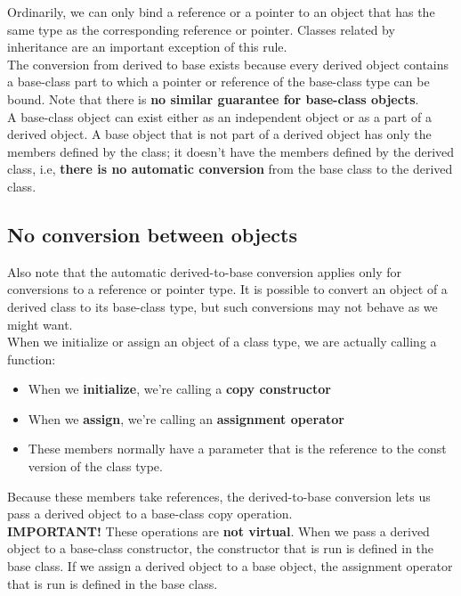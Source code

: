 Ordinarily, we can only bind a reference or a pointer to an object that has the same type as 
the corresponding reference or pointer. Classes related by inheritance are an important exception
of this rule.\\

The conversion from derived to base exists because every derived object contains a base-class 
part to which a pointer or reference of the base-class type can be bound. Note that there is
\textbf{no similar guarantee for base-class objects}. \\

A base-class object can exist either as an independent object or as a part of a derived object.
A base object that is not part of a derived object has only the members defined by the class;
it doesn't have the members defined by the derived class, i.e, \textbf{there is no automatic 
conversion} from the base class to the derived class.\\

\subsection{No conversion between objects}

Also note that the automatic derived-to-base conversion applies only for conversions to a reference
or pointer type. It is possible to convert an object of a derived class to its base-class type, but
such conversions may not behave as we might want.\\

When we initialize or assign an object of a class type, we are actually calling a function:
\begin{itemize}
    \item When we \textbf{initialize}, we're calling a \textbf{copy constructor}
    \item When we \textbf{assign}, we're calling an \textbf{assignment operator}
    \item These members normally have a parameter that is the reference to the const version of
    the class type.
\end{itemize}

Because these members take references, the derived-to-base conversion lets us pass a derived object
to a base-class copy operation.\\

\textbf{IMPORTANT!} These operations are \textbf{not virtual}. When we pass a derived object to a 
base-class constructor, the constructor that is run is defined in the base class. If we assign a 
derived object to a base object, the assignment operator that is run is defined in the base class.

